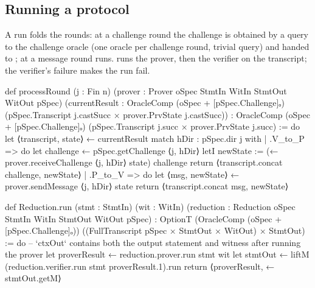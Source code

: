 
\subsection{Running a protocol}\label{sec:gen-lib-ark-run}

\begin{define}{A run}
 folds the rounds: at a challenge round the challenge is obtained by a
query to the challenge oracle  (one oracle per challenge round, trivial
query) and handed to ; at a message round  runs.
 runs the prover, then the verifier on the transcript; the verifier's failure
makes the run fail.
\end{define}

\begin{leancode}
def processRound (j : Fin n)
    (prover : Prover oSpec StmtIn WitIn StmtOut WitOut pSpec)
    (currentResult : OracleComp (oSpec + [pSpec.Challenge]ₒ)
      (pSpec.Transcript j.castSucc × prover.PrvState j.castSucc)) :
      OracleComp (oSpec + [pSpec.Challenge]ₒ)
        (pSpec.Transcript j.succ × prover.PrvState j.succ) := do
  let ⟨transcript, state⟩ ← currentResult
  match hDir : pSpec.dir j with
  | .V_to_P => do
    let challenge ← pSpec.getChallenge ⟨j, hDir⟩
    letI newState := (← prover.receiveChallenge ⟨j, hDir⟩ state) challenge
    return ⟨transcript.concat challenge, newState⟩
  | .P_to_V => do
    let ⟨msg, newState⟩ ← prover.sendMessage ⟨j, hDir⟩ state
    return ⟨transcript.concat msg, newState⟩
\end{leancode}



\begin{leancode}
def Reduction.run (stmt : StmtIn) (wit : WitIn)
    (reduction : Reduction oSpec StmtIn WitIn StmtOut WitOut pSpec) :
      OptionT (OracleComp (oSpec + [pSpec.Challenge]ₒ))
        ((FullTranscript pSpec × StmtOut × WitOut) × StmtOut) := do
  -- `ctxOut` contains both the output statement and witness after running the prover
  let proverResult ← reduction.prover.run stmt wit
  let stmtOut ← liftM (reduction.verifier.run stmt proverResult.1).run
  return ⟨proverResult, ← stmtOut.getM⟩
\end{leancode}

